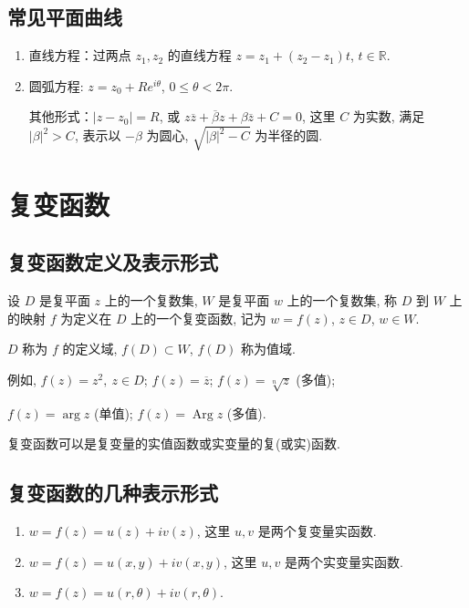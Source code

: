 \documentclass[theorem=false,mathfont=none,openany,sub3section]{easybook}
\begin{document}
\subsection{常见平面曲线}

\begin{enumerate}
  \item 直线方程：过两点 $z_{1},z_{2}$ 的直线方程 $z=z_{1}+(z_{2}-z_{1})t$, $t\in\mathbb{R}$.
  \item 圆弧方程: $z=z_{0}+Re^{i\theta}$, $0\leq\theta<2\pi$.\par
  其他形式：$|z-z_{0}|=R$, 或 $z\overline{z}+\overline{\beta}z+\beta\overline{z}+C=0$, 这里 $C$ 为实数, 满足 $|\beta|^{2}>C$, 表示以 $-\beta$ 为圆心, $\sqrt{|\beta|^{2}-C}$ 为半径的圆.
\end{enumerate}

\newpage

\section{复变函数}

\subsection{复变函数定义及表示形式}

\begin{definition}
  设 $D$ 是复平面 $z$ 上的一个复数集, $W$ 是复平面 $w$ 上的一个复数集, 称 $D$ 到 $W$ 上的映射 $f$ 为定义在 $D$ 上的一个复变函数, 记为 $w=f(z)$, $z\in D$, $w\in W$.\par
  $D$ 称为 $f$ 的定义域, $f(D)\subset W$, $f(D)$ 称为值域.\par
  例如, $f(z)=z^{2},\ z\in D$; $f(z)=\overline{z}$; $f(z)=\sqrt[n]{z}$ (多值);\par
  $f(z)=\arg z$ (单值); $f(z)=\operatorname{Arg}z$ (多值).
\end{definition}

\begin{remark}
  复变函数可以是复变量的实值函数或实变量的复(或实)函数.
\end{remark}

\subsection{复变函数的几种表示形式}

\begin{enumerate}
  \item $w=f(z)=u(z)+iv(z)$, 这里 $u,v$ 是两个复变量实函数.
  \item $w=f(z)=u(x,y)+iv(x,y)$, 这里 $u,v$ 是两个实变量实函数.
  \item $w=f(z)=u(r,\theta)+iv(r,\theta)$.
\end{enumerate}
\end{document}
